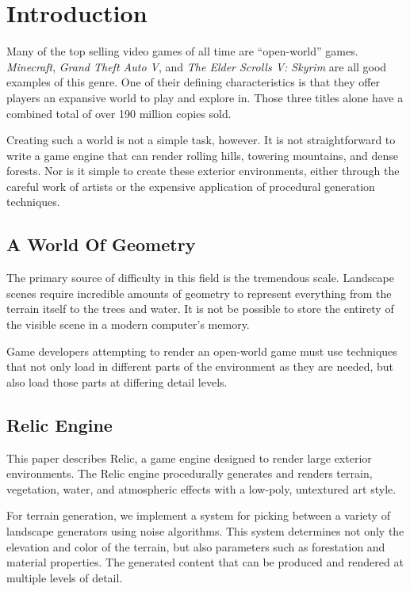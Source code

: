 
\chapter{Introduction}

Many of the top selling video games of all time are ``open-world'' games.
{\em Minecraft}, {\em Grand Theft Auto V}, and {\em The Elder Scrolls V: Skyrim} are all good examples of this genre.
One of their defining characteristics is that they offer players an expansive world to play and explore in.
Those three titles alone have a combined total of over 190 million copies sold.

Creating such a world is not a simple task, however.
It is not straightforward to write a game engine that can render rolling hills, towering mountains, and dense forests.
Nor is it simple to create these exterior environments, either through the careful work of artists or the expensive application of procedural generation techniques.


\section{A World Of Geometry}

The primary source of difficulty in this field is the tremendous scale.
Landscape scenes require incredible amounts of geometry to represent everything from the terrain itself to the trees and water.
It is not be possible to store the entirety of the visible scene in a modern computer's memory.

Game developers attempting to render an open-world game must use techniques that not only load in different parts of the environment as they are needed, but also load those parts at differing detail levels.


\section{Relic Engine}

This paper describes Relic, a game engine designed to render large exterior environments.
The Relic engine procedurally generates and renders terrain, vegetation, water, and atmospheric effects with a low-poly, untextured art style.

For terrain generation, we implement a system for picking between a variety of landscape generators using noise algorithms.
This system determines not only the elevation and color of the terrain, but also parameters such as forestation and material properties.
The generated content that can be produced and rendered at multiple levels of detail.

